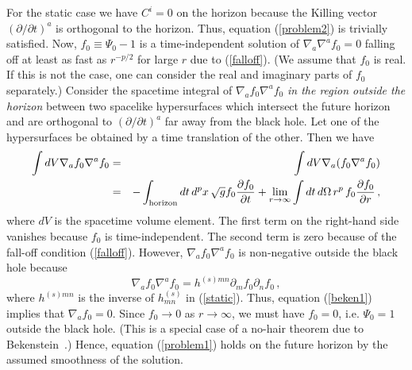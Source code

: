 \documentclass[a4paper,12pt]{article}
\begin{document}
For the static case we have $C^i = 0$ on the horizon
because the Killing vector $(\partial/\partial t)^a$ 
is orthogonal to the horizon.
Thus, equation (\ref{problem2}) is trivially satisfied. 
Now, $f_0 \equiv \Psi_0 - 1$ is a time-independent solution 
of $\nabla_a \nabla^a f_0 = 0$ falling off at least as fast as $r^{-p/2}$
for large $r$ due to (\ref{falloff}).  
(We assume that $f_0$ is real.  If this is not the case, one can consider the
real and imaginary parts of $f_0$ separately.)
Consider the spacetime integral 
of $\nabla_a f_0 \nabla^a f_0$ {\it in the region outside the horizon}
between two spacelike hypersurfaces which intersect the future horizon and 
are orthogonal to
$(\partial/\partial t)^a$ far away from the black hole.
Let one of the hypersurfaces be obtained by a time
translation of the other.  Then  we have
\begin{eqnarray}
\int dV \nabla_a f_0 \nabla^a f_0 & = &
\int dV \nabla_a (f_0 \nabla^a f_0) \nonumber \\
& = &
-\int_{\rm horizon} dt\,d^p x\,\sqrt{g}
f_0 \frac{\partial f_0}{\partial t}
+ \lim_{r\to \infty}\int dt\,d\Omega\, 
r^p\,f_0 \frac{\partial f_0}{\partial r}\,, \label{beken1}
\end{eqnarray}
where $dV$ is the spacetime volume element.  The first term on the right-hand
side vanishes
because $f_0$ is time-independent.  The second term is zero because
of the fall-off condition (\ref{falloff}). 
However, $\nabla_a f_0 \nabla^a f_0$ is non-negative 
outside the black hole because
\[
\nabla_a f_0 \nabla^a f_0  = h^{(s)mn}\partial_m f_0 \partial_n f_0\,,
\]
where $h^{(s)mn}$ is the inverse of $h^{(s)}_{mn}$ in (\ref{static}).
Thus, equation (\ref{beken1}) implies that $\nabla_a f_0 = 0$.  Since
$f_0 \to 0$ as $r \to \infty$,  we must have $f_0 = 0$, i.e.
$\Psi_0 = 1$ outside the black hole.  (This is 
a special case of a no-hair theorem due to Bekenstein~\cite{BE1}.) 
Hence, equation (\ref{problem1}) holds on the future horizon 
by the assumed smoothness of the solution.
\end{document}

